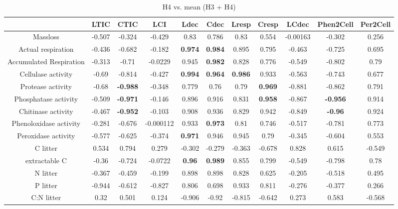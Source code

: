 \documentclass[authoryear,preprint,review,12pt]{elsarticle}
\begin{document}
\begin{table}[h!]
\begin{center}
\caption{H4 vs. mean (H3 + H4)}
\label{morecorr1}
{\tiny
\begin{tabular}{ccccccccccc}
  \hline
 & LTIC & CTIC & LCI & Ldec & Cdec & Lresp & Cresp & LCdec & Phen2Cell & Per2Cell \\ 
  \hline
Massloss & -0.507 & -0.324 & -0.429 & 0.83 & 0.786 & 0.83 & 0.554 & -0.00163 & -0.302 & 0.256 \\ 
  Actual respiration & -0.436 & -0.682 & -0.182 & \textbf{ 0.974 } & \textbf{ 0.984 } & 0.895 & 0.795 & -0.463 & -0.725 & 0.695 \\ 
  Accumulated Respiration & -0.313 & -0.71 & -0.0229 & 0.945 & \textbf{ 0.982 } & 0.828 & 0.776 & -0.549 & -0.802 & 0.79 \\ 
  Cellulase activity & -0.69 & -0.814 & -0.427 & \textbf{ 0.994 } & \textbf{ 0.964 } & \textbf{ 0.986 } & 0.933 & -0.563 & -0.743 & 0.677 \\ 
  Protease activity & -0.68 & \textbf{ -0.988 } & -0.348 & 0.779 & 0.76 & 0.79 & \textbf{ 0.969 } & -0.881 & -0.862 & 0.791 \\ 
  Phosphatase activity & -0.509 & \textbf{ -0.971 } & -0.146 & 0.896 & 0.916 & 0.831 & \textbf{ 0.958 } & -0.867 & \textbf{ -0.956 } & 0.914 \\ 
  Chitinase activity & -0.467 & \textbf{ -0.952 } & -0.103 & 0.908 & 0.936 & 0.829 & 0.942 & -0.849 & \textbf{ -0.96 } & 0.924 \\ 
  Phenoloxidase activity & -0.281 & -0.676 & -0.000112 & 0.933 & \textbf{ 0.973 } & 0.81 & 0.746 & -0.517 & -0.781 & 0.773 \\ 
  Peroxidase activity & -0.577 & -0.625 & -0.374 & \textbf{ 0.971 } & 0.946 & 0.945 & 0.79 & -0.345 & -0.604 & 0.553 \\ 
  C litter & 0.534 & 0.794 & 0.279 & -0.302 & -0.279 & -0.363 & -0.678 & 0.828 & 0.615 & -0.549 \\ 
  extractable C & -0.36 & -0.724 & -0.0722 & \textbf{ 0.96 } & \textbf{ 0.989 } & 0.855 & 0.799 & -0.549 & -0.798 & 0.78 \\ 
  N litter & -0.367 & -0.459 & -0.199 & 0.898 & 0.898 & 0.828 & 0.625 & -0.205 & -0.518 & 0.495 \\ 
  P litter & -0.944 & -0.612 & -0.827 & 0.806 & 0.698 & 0.933 & 0.811 & -0.276 & -0.377 & 0.266 \\ 
  C:N litter & 0.32 & 0.501 & 0.124 & -0.906 & -0.92 & -0.815 & -0.642 & 0.273 & 0.583 & -0.568 \\ 

\end{tabular}}
\end{center}
\end{table}
\end{document}
